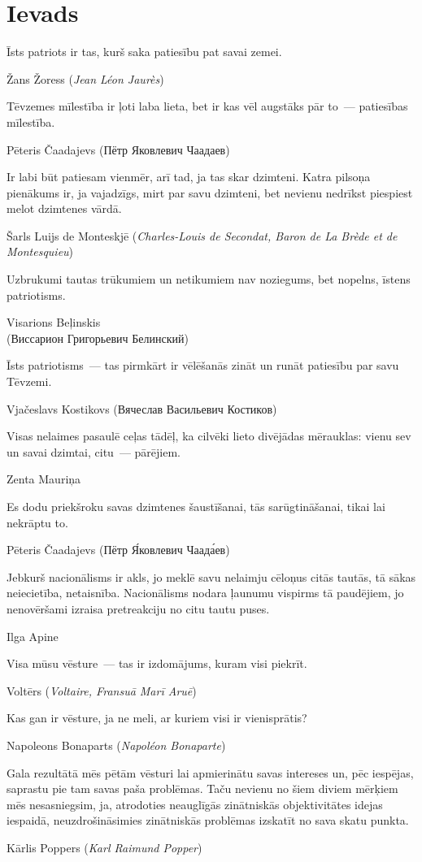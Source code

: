 \documentclass[twoside,a5paper,12pt,fleqn,openany]{extbook}
\newcommand{\rutxti}[1]{\textrussian{#1}}
\newcommand{\frtxti}[1]{\textit{\textfrench{#1}}}
\newcommand{\entxti}[1]{\textit{\textenglish{#1}}}
\begin{document}
\chapter*{Ievads}

\epigraph
{Īsts patriots ir tas, kurš saka patiesību pat savai zemei.}
{Žans Žoress (\frtxti{Jean Léon Jaurès})}

\epigraph
{Tēvzemes mīlestība ir ļoti laba lieta, bet ir kas vēl augstāks pār to~--- patiesības mīlestība.}
{Pēteris Čaadajevs (\rutxti{Пётр Яковлевич Чаадаев})}

\epigraph
{Ir labi būt patiesam vienmēr, arī tad, ja tas skar dzimteni. Katra pilsoņa pienākums ir, ja vajadzīgs, mirt par savu dzimteni, bet nevienu nedrīkst piespiest melot dzimtenes vārdā.}
{Šarls Luijs de Monteskjē (\frtxti{Charles-Louis de Secondat, Baron de La Brède et de Montesquieu})}

\epigraph
{Uzbrukumi tautas trūkumiem un netikumiem nav noziegums, bet nopelns, īstens patriotisms.}
{Visarions Beļinskis\\(\rutxti{Виссарион Григорьевич Белинский})}



\epigraph
{Īsts patriotisms~--- tas pirmkārt ir vēlēšanās zināt un runāt patiesību par savu Tēvzemi.}
{Vjačeslavs Kostikovs (\rutxti{Вячеслав Васильевич Костиков})}

\epigraph
{Visas nelaimes pasaulē ceļas tādēļ, ka cilvēki lieto divējādas mērauklas: vienu sev un savai dzimtai, citu~--- pārējiem.}
{Zenta Mauriņa}

\epigraph
{Es dodu priekšroku savas dzimtenes šaustīšanai, tās sarūgtināšanai, tikai lai nekrāptu to.}
{Pēteris Čaadajevs (\rutxti{Пётр Я́ковлевич Чаада́ев})}

\epigraph
{Jebkurš nacionālisms ir akls, jo meklē savu nelaimju cēloņus citās tautās, tā sākas neiecietība, netaisnība. Nacionālisms nodara ļaunumu vispirms tā paudējiem, jo nenovēršami izraisa pretreakciju no citu tautu puses.}
{Ilga Apine}

\epigraph
{Visa mūsu vēsture~--- tas ir izdomājums, kuram visi piekrīt.}
{Voltērs (\frtxti{Voltaire, Fransuā Marī Aruē})}



\epigraph
{Kas gan ir vēsture, ja ne meli, ar kuriem visi ir vienisprātis?}
{Napoleons Bonaparts (\frtxti{Napoléon Bonaparte})}

\epigraph
{Gala rezultātā mēs pētām vēsturi lai apmierinātu savas intereses un, pēc iespējas, saprastu pie tam savas paša problēmas. Taču nevienu no šiem diviem mērķiem mēs nesasniegsim, ja, atrodoties neauglīgās zinātniskās objektivitātes idejas iespaidā, neuzdrošināsimies zinātniskās problēmas izskatīt no sava skatu punkta.}
{Kārlis Poppers (\entxti{Karl Raimund Popper})}
\end{document}
